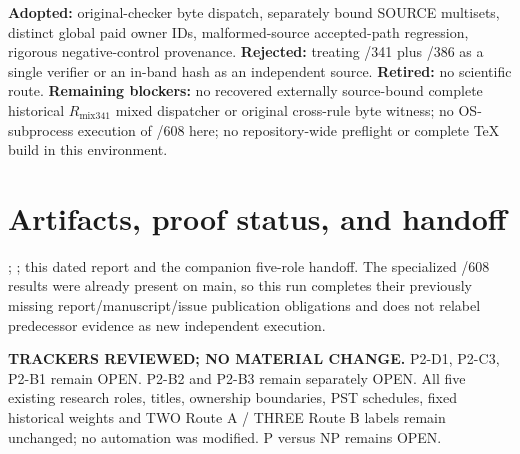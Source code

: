 \documentclass[11pt]{article}
\begin{document}
\noindent\textbf{Adopted:} original-checker byte dispatch, separately bound SOURCE multisets, distinct global paid owner IDs, malformed-source accepted-path regression, rigorous negative-control provenance. \textbf{Rejected:} treating /341 plus /386 as a single verifier or an in-band hash as an independent source. \textbf{Retired:} no scientific route. \textbf{Remaining blockers:} no recovered externally source-bound complete historical $R_{\mathrm{mix341}}$ mixed dispatcher or original cross-rule byte witness; no OS-subprocess execution of /608 here; no repository-wide preflight or complete TeX build in this environment.

\section*{Artifacts, proof status, and handoff}
; ; this dated report and the companion five-role handoff. The specialized /608 results were already present on main, so this run completes their previously missing report/manuscript/issue publication obligations and does not relabel predecessor evidence as new independent execution.

\noindent\textbf{TRACKERS REVIEWED; NO MATERIAL CHANGE.} P2-D1, P2-C3, P2-B1 remain OPEN. P2-B2 and P2-B3 remain separately OPEN. All five existing research roles, titles, ownership boundaries, PST schedules, fixed historical weights and TWO Route A / THREE Route B labels remain unchanged; no automation was modified. P versus NP remains OPEN.
\end{document}

